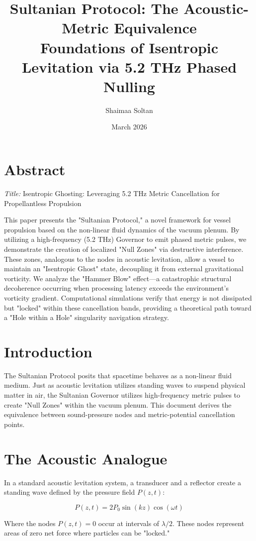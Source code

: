 \documentclass[11pt,a4paper]{article}
\title{Sultanian Protocol: The Acoustic-Metric Equivalence \\ \large Foundations of Isentropic Levitation via 5.2 THz Phased Nulling}
\author{Shaimaa Soltan}
\date{March 2026}
\begin{document}
\maketitle
\section{Abstract}
\textit{Title:} Isentropic Ghosting: Leveraging 5.2 THz Metric Cancellation for Propellantless Propulsion

This paper presents the "Sultanian Protocol," a novel framework for vessel propulsion based on the non-linear fluid dynamics of the vacuum plenum. By utilizing a high-frequency (5.2 THz) Governor to emit phased metric pulses, we demonstrate the creation of localized "Null Zones" via destructive interference. These zones, analogous to the nodes in acoustic levitation, allow a vessel to maintain an "Isentropic Ghost" state, decoupling it from external gravitational vorticity. We analyze the "Hammer Blow" effect—a catastrophic structural decoherence occurring when processing latency exceeds the environment's vorticity gradient. Computational simulations verify that energy is not dissipated but "locked" within these cancellation bands, providing a theoretical path toward a "Hole within a Hole" singularity navigation strategy.\\
\section{Introduction}
The Sultanian Protocol posits that spacetime behaves as a non-linear fluid medium. Just as acoustic levitation utilizes standing waves to suspend physical matter in air, the Sultanian Governor utilizes high-frequency metric pulses to create "Null Zones" within the vacuum plenum. This document derives the equivalence between sound-pressure nodes and metric-potential cancellation points.

\section{The Acoustic Analogue}
In a standard acoustic levitation system, a transducer and a reflector create a standing wave defined by the pressure field $P(z,t)$:

\begin{equation}
    P(z,t) = 2P_0 \sin(kz) \cos(\omega t)
\end{equation}

Where the nodes $P(z,t) = 0$ occur at intervals of $\lambda/2$. These nodes represent areas of zero net force where particles can be "locked."
\end{document}

